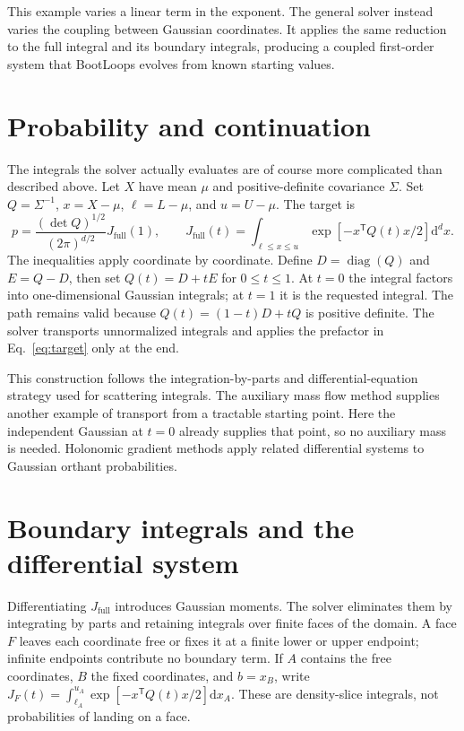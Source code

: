 \documentclass[aps,pra,onecolumn,11pt,tightenlines,notitlepage,nofootinbib]{revtex4-2}
\newcommand{\dd}{\mathrm{d}}
\begin{document}
This example varies a linear term in the exponent. The general solver
instead varies the coupling between Gaussian coordinates. It applies the
same reduction to the full integral and its boundary integrals, producing
a coupled first-order system that BootLoops evolves from known starting
values.

\section{Probability and continuation}
The integrals the solver actually evaluates are of course more complicated
than described above. Let $X$ have mean $\mu$ and positive-definite covariance
$\Sigma$. Set
$Q=\Sigma^{-1}$, $x=X-\mu$, $\ell=L-\mu$, and $u=U-\mu$. The target is
\begin{equation}
 p=\frac{(\det Q)^{1/2}}{(2\pi)^{d/2}}J_{\mathrm{full}}(1),\qquad
 J_{\mathrm{full}}(t)=\int_{\ell\leq x\leq u}
 \exp[-x^{\mathsf T}Q(t)x/2]\dd^d x .
 \label{eq:target}
\end{equation}
The inequalities apply coordinate by coordinate. Define
$D=\operatorname{diag}(Q)$ and $E=Q-D$, then set $Q(t)=D+tE$ for
$0\leq t\leq1$. At $t=0$ the integral factors into one-dimensional Gaussian
integrals; at $t=1$ it is the requested integral. The path remains valid
because $Q(t)=(1-t)D+tQ$ is positive definite. The solver transports
unnormalized integrals and applies the prefactor in Eq.~\eqref{eq:target}
only at the end.

This construction follows the integration-by-parts and differential-equation
strategy used for scattering integrals\cite{chetyrkin,kotikov,bootloops}.
The auxiliary mass flow method supplies another example of transport from a
tractable starting point\cite{amflow}. Here the independent Gaussian at
$t=0$ already supplies that point, so no auxiliary mass is needed.
Holonomic gradient methods apply related differential systems to Gaussian
orthant probabilities\cite{holonomic}.

\section{Boundary integrals and the differential system}
Differentiating $J_{\mathrm{full}}$ introduces Gaussian moments. The solver
eliminates them by integrating by parts and retaining integrals over finite
faces of the domain. A face $F$ leaves each coordinate free or fixes it at a
finite lower or upper endpoint; infinite endpoints contribute no boundary
term. If $A$ contains the free coordinates, $B$ the fixed coordinates, and
$b=x_B$, write
$J_F(t)=\int_{\ell_A}^{u_A}\exp[-x^{\mathsf T}Q(t)x/2]\dd x_A$.
These are density-slice integrals, not probabilities of landing on a face.
\end{document}
